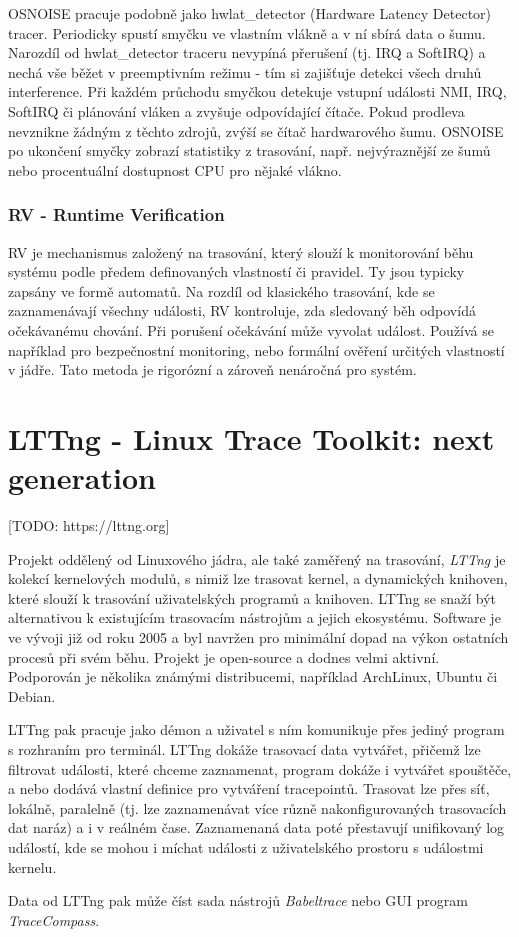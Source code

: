 OSNOISE pracuje podobně jako hwlat\_detector (Hardware Latency Detector) tracer. Periodicky spustí smyčku ve vlastním vlákně a v ní sbírá data o šumu. Narozdíl od hwlat\_detector traceru nevypíná přerušení (tj. IRQ a SoftIRQ) a nechá vše běžet v preemptivním režimu - tím si zajišťuje detekci všech druhů interference. Při každém průchodu smyčkou detekuje vstupní události NMI, IRQ, SoftIRQ či plánování vláken a zvyšuje odpovídající čítače. Pokud prodleva nevznikne žádným z těchto zdrojů, zvýší se čítač hardwarového šumu. OSNOISE po ukončení smyčky zobrazí statistiky z trasování, např. nejvýraznější ze šumů nebo procentuální dostupnost CPU pro nějaké vlákno.

\subsubsection*{RV - Runtime Verification}

RV je mechanismus založený na trasování, který slouží k monitorování běhu systému podle předem definovaných vlastností či pravidel. Ty jsou typicky zapsány ve formě automatů. Na rozdíl od klasického trasování, kde se zaznamenávají všechny události, RV kontroluje, zda sledovaný běh odpovídá očekávanému chování. Při porušení očekávání může vyvolat událost. Používá se například pro bezpečnostní monitoring, nebo formální ověření určitých vlastností v jádře. Tato metoda je rigorózní a zároveň nenáročná pro systém.

\section{LTTng - Linux Trace Toolkit: next generation}

[TODO: https://lttng.org]

Projekt oddělený od Linuxového jádra, ale také zaměřený na trasování, \emph{LTTng} je kolekcí kernelových modulů, s nimiž lze trasovat kernel, a dynamických knihoven, které slouží k trasování uživatelských programů a knihoven. LTTng se snaží být alternativou k existujícím trasovacím nástrojům a jejich ekosystému. Software je ve vývoji již od roku 2005 a byl navržen pro minimální dopad na výkon ostatních procesů při svém běhu. Projekt je open-source a dodnes velmi aktivní. Podporován je několika známými distribucemi, například ArchLinux, Ubuntu či Debian.

LTTng pak pracuje jako démon a uživatel s ním komunikuje přes jediný program s rozhraním pro terminál. LTTng dokáže trasovací data vytvářet, přičemž lze filtrovat události, které chceme zaznamenat, program dokáže i vytvářet spouštěče, a nebo dodává vlastní definice pro vytváření tracepointů. Trasovat lze přes síť, lokálně, paralelně (tj. lze zaznamenávat více různě nakonfigurovaných trasovacích dat naráz) a i v reálném čase. Zaznamenaná data poté přestavují unifikovaný log událostí, kde se mohou i míchat události z uživatelského prostoru s událostmi kernelu.

Data od LTTng pak může číst sada nástrojů \emph{Babeltrace} nebo GUI program \emph{TraceCompass}.